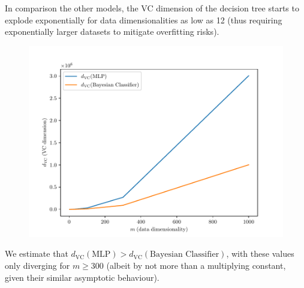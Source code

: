 \documentclass{exam}
\begin{document}
\begin{questions}
\begin{parts}
            In comparison the other models, the VC dimension of the decision tree starts to explode exponentially for data dimensionalities as low as 12 (thus requiring exponentially larger datasets to mitigate overfitting risks).
            \vspace{1em}
            \item \quad 
            \vspace{-3.0em}
            \begin{figure}[H]
                \centering
                \includegraphics[scale = 0.75]{vc_4_b.pdf}
            \end{figure}
            We estimate that $d_{\text{VC}}(\text{MLP}) > d_{\text{VC}}(\text{Bayesian Classifier})$, with these values only diverging for $m \ge 300$ (albeit by not more than a multiplying constant, given their similar asymptotic behaviour).
        \end{parts}
    \end{questions}
\end{document}
